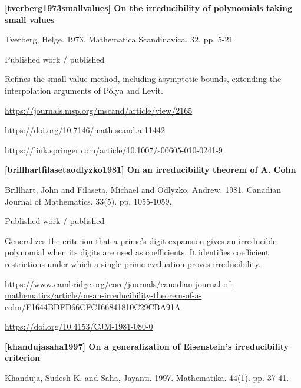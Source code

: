 \documentclass[11pt,a4paper,oneside,openany]{book}
\begin{document}
\vspace{9pt}
\hypertarget{ref:tverberg1973smallvalues}{}
{\sffamily\bfseries\color{atlasgreen}[tverberg1973smallvalues] On the irreducibility of polynomials taking small values}\par
\color{black} Tverberg, Helge. 1973. Mathematica Scandinavica. 32. pp. 5-21.\par
{\small\sffamily\color{atlasgold}Published work / published}\par
\color{black} Refines the small-value method, including asymptotic bounds, extending the interpolation arguments of Pólya and Levit.\par
{\footnotesize\url{https://journals.msp.org/mscand/article/view/2165}}\par
{\footnotesize\url{https://doi.org/10.7146/math.scand.a-11442}}\par
{\footnotesize\url{https://link.springer.com/article/10.1007/s00605-010-0241-9}}\par
\vspace{9pt}
\hypertarget{ref:brillhartfilasetaodlyzko1981}{}
{\sffamily\bfseries\color{atlasgreen}[brillhartfilasetaodlyzko1981] On an irreducibility theorem of A. Cohn}\par
\color{black} Brillhart, John and Filaseta, Michael and Odlyzko, Andrew. 1981. Canadian Journal of Mathematics. 33(5). pp. 1055-1059.\par
{\small\sffamily\color{atlasgold}Published work / published}\par
\color{black} Generalizes the criterion that a prime's digit expansion gives an irreducible polynomial when its digits are used as coefficients. It identifies coefficient restrictions under which a single prime evaluation proves irreducibility.\par
{\footnotesize\url{https://www.cambridge.org/core/journals/canadian-journal-of-mathematics/article/on-an-irreducibility-theorem-of-a-cohn/F1644BDFD66CFC166841810C29CBA91A}}\par
{\footnotesize\url{https://doi.org/10.4153/CJM-1981-080-0}}\par
\vspace{9pt}
\hypertarget{ref:khandujasaha1997}{}
{\sffamily\bfseries\color{atlasgreen}[khandujasaha1997] On a generalization of Eisenstein's irreducibility criterion}\par
\color{black} Khanduja, Sudesh K. and Saha, Jayanti. 1997. Mathematika. 44(1). pp. 37-41.\par
\end{document}
